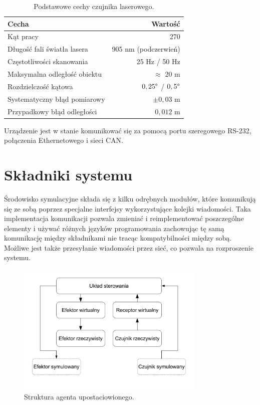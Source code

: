	\begin{table}
	\centering
	\begin{tabular}{l r}
	Cecha & Wartość \\
	\hline
	Kąt pracy & 270\textdegree \\
	Długość fali światła lasera & 905 nm (podczerwień) \\
	Częstotliwości skanowania & 25 Hz / 50 Hz \\
	Maksymalna odległość obiektu & $\approx$ 20 m \\
	Rozdzielczość kątowa & $0,25 \degree$ / $0,5 \degree $ \\
	Systematyczny błąd pomiarowy & $\pm 0,03$ m \\
	Przypadkowy błąd odległości & $0,012$ m \\
	\end{tabular}
	\caption{Podstawowe cechy czujnika laserowego.}
	\label{tab:lidar}
	\end{table}
	Urządzenie jest w stanie komunikować się za pomocą portu szeregowego RS-232, połączenia Ethernetowego i sieci CAN.

\section{Składniki systemu}
	Środowisko symulacyjne składa się z kilku odrębnych modułów, które komunikują się ze sobą poprzez specjalne interfejsy wykorzystujące kolejki wiadomości.
	Taka implementacja komunikacji pozwala zmieniać i reimplementować poszczególne elementy i używać różnych języków programowania zachowując tę samą komunikację między składnikami nie tracąc kompatybilności między sobą.
	Możliwe jest także przesyłanie wiadomości przez sieć, co pozwala na rozproszenie systemu.

	\begin{figure}[H]
	\centering
	\includegraphics[width=0.8\textwidth]{graphics/agent.pdf}
	\caption{Struktura agenta upostaciowionego.}
	\label{fig:agent}
	\end{figure} 

